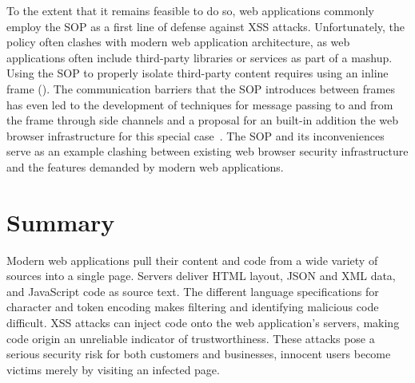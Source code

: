 To the extent that it remains feasible to do so, web applications commonly employ the SOP as a first line of defense against XSS attacks.
Unfortunately, the policy often clashes with modern web application architecture, as web applications often include third-party libraries or services as part of a mashup.
Using the SOP to properly isolate third-party content requires using an inline frame ().
The communication barriers that the SOP introduces between frames has even led to the development of techniques for message passing to and from the frame through side channels and a proposal for an built-in addition the web browser infrastructure for this special case~\cite{barth.etal+08, barth.etal+09}.
The SOP and its inconveniences serve as an example clashing between existing web browser security infrastructure and the features demanded by modern web applications.

\section{Summary}

Modern web applications pull their content and code from a wide variety of sources into a single page.
Servers deliver HTML layout, JSON and XML data, and JavaScript code as source text.
The different language specifications for character and token encoding makes filtering and identifying malicious code difficult.
XSS attacks can inject code onto the web application's servers, making code origin an unreliable indicator of trustworthiness.
These attacks pose a serious security risk for both customers and businesses, innocent users become victims merely by visiting an infected page.

